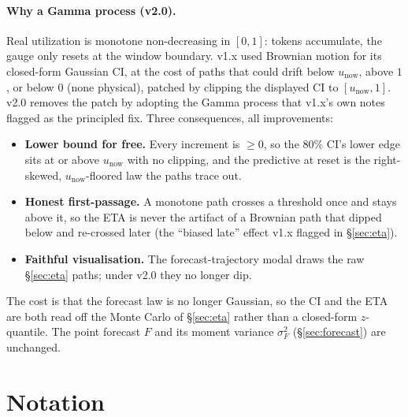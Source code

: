 \documentclass[11pt]{article}
\newcommand{\unow}{u_{\text{now}}}
\begin{document}
\paragraph{Why a Gamma process (v2.0).} Real utilization is monotone
non-decreasing in $[0,1]$: tokens accumulate, the gauge only resets at the
window boundary. v1.x used Brownian motion for its closed-form Gaussian CI, at
the cost of paths that could drift below $\unow$, above $1$, or below $0$
(none physical), patched by clipping the displayed CI to $[\unow, 1]$. v2.0
removes the patch by adopting the Gamma process that v1.x's own notes flagged
as the principled fix. Three consequences, all improvements:
\begin{itemize}
  \item \textbf{Lower bound for free.} Every increment is $\ge 0$, so the 80\%
    CI's lower edge sits at or above $\unow$ with no clipping, and the
    predictive at reset is the right-skewed, $\unow$-floored law the paths
    trace out.
  \item \textbf{Honest first-passage.} A monotone path crosses a threshold
    once and stays above it, so the ETA is never the artifact of a Brownian
    path that dipped below and re-crossed later (the ``biased late'' effect
    v1.x flagged in \S\ref{sec:eta}).
  \item \textbf{Faithful visualisation.} The forecast-trajectory modal draws
    the raw \S\ref{sec:eta} paths; under v2.0 they no longer dip.
\end{itemize}
The cost is that the forecast law is no longer Gaussian, so the CI and the ETA
are both read off the Monte Carlo of \S\ref{sec:eta} rather than a closed-form
$z$-quantile. The point forecast $F$ and its moment variance $\sigma_F^2$
(\S\ref{sec:forecast}) are unchanged.

\section{Notation}
\end{document}
